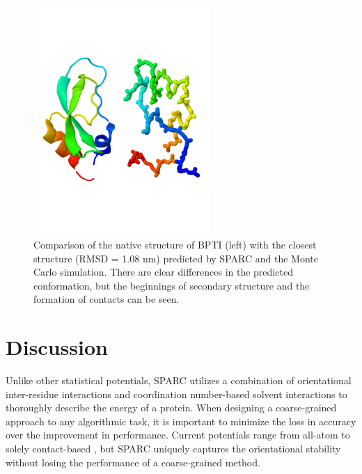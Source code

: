 \documentclass[11pt,titlepage]{article}
\begin{document}
\begin{figure}
	\begin{center}
		\includegraphics[width=0.6\textwidth, trim=0 5.5cm 0 5.5cm, clip=true]{bpti_structures}
	\end{center}
	\caption{Comparison of the native structure of BPTI (left) with the closest structure (RMSD = 1.08 nm) predicted by SPARC and the Monte Carlo simulation. There are clear differences in the predicted conformation, but the beginnings of secondary structure and the formation of contacts can be seen.}
	\label{bpti_structures}
\end{figure}

\section{Discussion}
Unlike other statistical potentials, SPARC utilizes a combination of orientational inter-residue interactions and coordination number-based solvent interactions to thoroughly describe the energy of a protein.
When designing a coarse-grained approach to any algorithmic task, it is important to minimize the loss in accuracy over the improvement in performance.
Current potentials range from all-atom \cite{basdevant} to solely contact-based \cite{buchete2}, but SPARC uniquely captures the orientational stability without losing the performance of a coarse-grained method.
\end{document}
